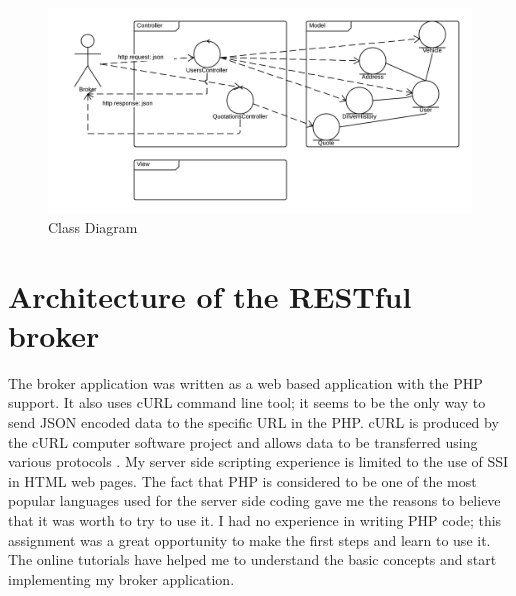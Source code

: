 \documentclass[10pt,a4paper,headinclude=true,twoside]{report}
\begin{document}
\begin{figure}[H]
\centering
\centerline{\includegraphics[scale=0.25]{./ClassDesign}}
\caption{Class Diagram}
\label{fig:ClassDesign}
\end{figure}



\section{Architecture of the RESTful broker}
The broker application was written as a web based application with the PHP support. It also uses cURL command line tool; it seems to be the only way to send JSON encoded data to the specific URL in the PHP. cURL is produced by the cURL computer software project and allows data to be transferred using various protocols \cite{cURL}. My server side scripting experience is limited to the use of SSI in HTML web pages. The fact that PHP is considered to be one of the most popular languages used for the server side coding \cite{PHP} gave me the reasons to believe that it was worth to try to use it. I had no experience in writing PHP code; this assignment was a great opportunity to make the first steps and learn to use it. The online tutorials have helped me to understand the basic concepts and start implementing my broker application.
\end{document}
